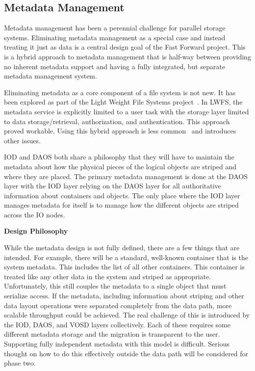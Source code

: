 \documentclass[conference]{IEEEtran}
\begin{document}
\subsection{Metadata Management}
Metadata management has been a perennial challenge for parallel storage
systems.  Eliminating metadata management as a special case and instead
treating it just as data is a central design goal of the Fast Forward project.
This is a hybrid approach to metadata management that is half-way between
providing no inherent metadata support and having a fully integrated, but
separate metadata management system.

Eliminating metadata as a core component of a file system is not new. It has
been explored as part of the Light Weight File Systems
project~\cite{oldfield:lwfs}. In LWFS, the metadata service is explicitly
limited to a user task with the storage layer limited to data
storage/retrieval, authorization, and authentication. This approach proved
workable. Using this hybrid approach is less common~\cite{weil:2006:ceph} and
introduces other issues.

IOD and DAOS both share a philosophy that they will have to maintain the
metadata about how the physical pieces of the logical objects are striped and
where they are placed. The primary metadata management is done at the DAOS
layer with the IOD layer relying on the DAOS layer for all authoritative
information about containers and objects. The only place where the IOD layer
manages metadata for itself is to manage how the different objects are striped
across the IO nodes.

\noindent\textbf{Design Philosophy}

While the metadata design is not fully defined, there are a few things that
are intended. For example, there will be a standard, well-known container that
is the system metadata. This includes the list of all other containers. This
container is treated like any other data in the system and striped as
appropriate. Unfortunately, this still couples the metadata to a single object
that must serialize access. If the metadata, including information about
striping and other data layout operations were separated completely from the
data path, more scalable throughput could be achieved. The real challenge of
this is introduced by the IOD, DAOS, and VOSD layers collectively. Each of
these requires some different metadata storage and the migration is transparent
to the user.  Supporting fully independent metadata with this model is
difficult. Serious thought on how to do this effectively outside the data path
will be considered for phase two.
\end{document}

